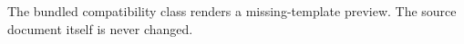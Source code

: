 \documentclass{cisXXX}
\begin{document}
\maketitle
\HWproblem
The bundled compatibility class renders a missing-template preview.
\HWsubproblem
The source document itself is never changed.
\end{document}
